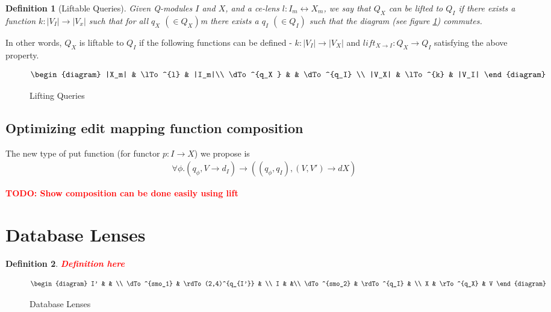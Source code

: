 \documentclass[a4paper,10pt]{article}
\newtheorem{definition}{Definition}
\newcommand{\finish}[1]{#1}
\newcommand{\comment}[1]{\finish{\textbf{\textcolor{red}{#1}}}}
\begin{document}
\begin{definition}[Liftable Queries]
Given Q-modules $I$ and $X$, and a ce-lens $l : I_m \leftrightarrow X_m$, we say that $Q_X$ can be lifted to $Q_I$ if there exists a function $k : |V_I| \to |V_x|$ such that for all $q_X$ $(\in Q_X)$m there exists a $q_I$ $(\in Q_I)$ such that the diagram (see figure \ref{fig:lifting-queries}) commutes. 
\end{definition}

In other words, $Q_X$ is liftable to $Q_I$ if the following functions can be defined - $k: |V_I|  \to|V_X|$ and $lift_{X \to I}: Q_X \to Q_I$ satisfying the above property. 


\begin{figure}[ht]
\begin{displaymath}
\begin{diagram}
|X_m| & \lTo^{l} & |I_m|\\
\dTo^{q_X } & & \dTo^{q_I} \\
|V_X| & \lTo^{k} & |V_I| 
\end{diagram}
\end{displaymath}
\caption{Lifting Queries}
\label{fig:lifting-queries}
\end{figure}

\subsection{Optimizing edit mapping function composition}
The new type of put function (for functor $p: I \to X$) we propose is
\begin{align*}
\forall \phi. (q_{\phi}, V \to d_I) \to ((q_{\phi},q_I), (V,V') \to dX) 
\end{align*}

\comment{TODO: Show composition can be done easily using lift} 

\section{Database Lenses}

\begin{definition}
\comment{Definition here}
\end{definition}


\begin{figure}[ht]
\begin{displaymath}
\begin{diagram}
I' & & \\
\dTo^{smo_1} & \rdTo(2,4)^{q_{I'}} & \\
I & &\\
\dTo^{smo_2} & \rdTo^{q_I} & \\
X & \rTo^{q_X} & V
\end{diagram}
\end{displaymath}
\caption{Database Lenses}
\label{fig:database-lens}
\end{figure}
\end{document}
